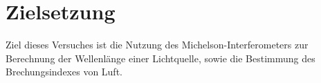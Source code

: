 \section{Zielsetzung}
\label{sec:Zielsetzung}


Ziel dieses Versuches ist die Nutzung des Michelson-Interferometers zur Berechnung der Wellenlänge einer Lichtquelle, sowie die Bestimmung des Brechungsindexes von Luft.